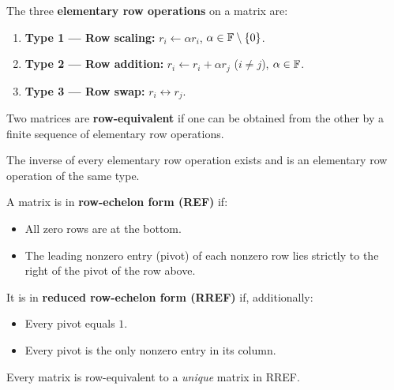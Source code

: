 \begin{defbox}
The three \textbf{elementary row operations} on a matrix are:
\begin{enumerate}
    \item \textbf{Type 1 — Row scaling:} $r_i \leftarrow \alpha r_i$,
          $\alpha\in\mathbb{F}\setminus\{0\}$.
    \item \textbf{Type 2 — Row addition:}
          $r_i \leftarrow r_i + \alpha r_j$ ($i\neq j$), $\alpha\in\mathbb{F}$.
    \item \textbf{Type 3 — Row swap:} $r_i \leftrightarrow r_j$.
\end{enumerate}
Two matrices are \textbf{row-equivalent} if one can be obtained from the other
by a finite sequence of elementary row operations.
\end{defbox}

\begin{thmbox}
The inverse of every elementary row operation exists and is an elementary row
operation of the same type.
\end{thmbox}

\begin{defbox}
A matrix is in \textbf{row-echelon form (REF)} if:
\begin{itemize}
    \item All zero rows are at the bottom.
    \item The leading nonzero entry (pivot) of each nonzero row lies strictly
          to the right of the pivot of the row above.
\end{itemize}
It is in \textbf{reduced row-echelon form (RREF)} if, additionally:
\begin{itemize}
    \item Every pivot equals $1$.
    \item Every pivot is the only nonzero entry in its column.
\end{itemize}
\end{defbox}

\begin{thmbox}
Every matrix is row-equivalent to a \emph{unique} matrix in RREF.
\end{thmbox}

